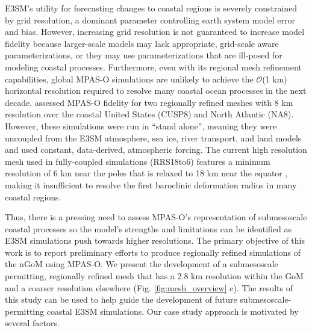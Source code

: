 E3SM’s utility for forecasting changes to coastal regions is severely constrained by grid resolution, a dominant parameter controlling earth system model error and bias. However, increasing grid resolution is not guaranteed to increase model fidelity because larger-scale models may lack appropriate, grid-scale aware parameterizations, or they may use parameterizations that are ill-posed for modeling coastal processes. Furthermore, even with its regional mesh refinement capabilities, global MPAS-O simulations are unlikely to achieve the $\mathcal{O}$(1 km) horizontal resolution required to resolve many coastal ocean processes in the next decade. \cite{hoch2020mpas} assessed MPAS-O fidelity for two regionally refined meshes with 8 km resolution over the coastal United States (CUSP8) and North Atlantic (NA8). However, these simulations were run in ``stand alone'', meaning they were uncoupled from the E3SM atmosphere, sea ice, river transport, and land models and used constant, data-derived, atmospheric forcing. The current high resolution mesh used in fully-coupled simulations (RRS18to6) features a minimum resolution of 6 km near the poles that is relaxed to 18 km near the equator \citep[see Fig. 2 of ][]{caldwell2019doe}, making it insufficient to resolve the first baroclinic deformation radius in many coastal regions. 

Thus, there is a pressing need to assess MPAS-O's representation of submesoscale coastal processes so the model's strengths and limitations can be identified as E3SM simulations push towards higher resolutions. The primary objective of this work is to report preliminary efforts to produce regionally refined simulations of the nGoM using MPAS-O. We present the development of a submesoscale permitting, regionally refined mesh that has a 2.8 km resolution within the GoM and a coarser resolution elsewhere (Fig. \ref{fig:mesh_overview} c). The results of this study can be used to help guide the development of future submesoscale-permitting coastal E3SM simulations. Our case study approach is motivated by several factors.

